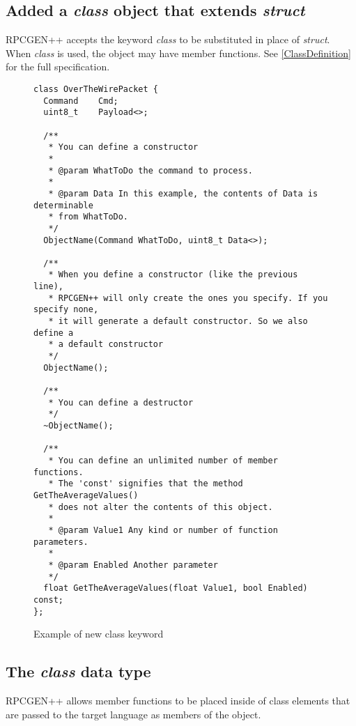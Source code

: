 \subsection{Added a \textit{class} object that extends \textit{struct}}
RPCGEN++ accepts the keyword \textit{class} to be substituted in
place of \textit{struct}.
When \textit{class} is used, the object may have member functions.
See \ref{ClassDefinition} for the full specification.
\begin{figure}
\begin{verbatim}
class OverTheWirePacket {
  Command    Cmd;
  uint8_t    Payload<>;

  /**
   * You can define a constructor
   *
   * @param WhatToDo the command to process.
   *
   * @param Data In this example, the contents of Data is determinable
   * from WhatToDo.
   */
  ObjectName(Command WhatToDo, uint8_t Data<>);

  /**  
   * When you define a constructor (like the previous line),
   * RPCGEN++ will only create the ones you specify. If you specify none,
   * it will generate a default constructor. So we also define a
   * a default constructor
   */
  ObjectName();

  /**
   * You can define a destructor
   */
  ~ObjectName();

  /**
   * You can define an unlimited number of member functions.
   * The 'const' signifies that the method GetTheAverageValues()
   * does not alter the contents of this object.
   *
   * @param Value1 Any kind or number of function parameters.
   *
   * @param Enabled Another parameter
   */
  float GetTheAverageValues(float Value1, bool Enabled) const;
};

\end{verbatim}
\caption{Example of new class keyword}
\label{fig:ClassIntroXDR}
\end{figure}

\subsection{The \textit{class} data type}\label{sec:ClassDefinition}
RPCGEN++ allows member functions to be placed inside
of class elements that are passed to the target
language as members of the object.


